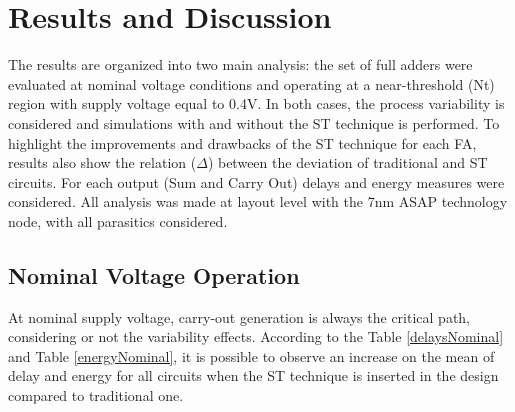 \documentclass[ecp,tc, english]{iiufrgs}
\begin{document}
\chapter{Results and Discussion}

The results are organized into two main analysis: the set of full adders were evaluated at nominal voltage conditions and operating at a near-threshold (Nt) region with supply voltage equal to 0.4V. In both cases, the process variability is considered and simulations with and without the ST technique is performed. To highlight the improvements and drawbacks of the ST technique for each FA, results also show the relation (\(\Delta\)) between the deviation of traditional and ST circuits. For each output (Sum and Carry Out) delays and energy measures were considered. All analysis was made at layout level with the 7nm ASAP technology node, with all parasitics considered. 






\section{Nominal Voltage Operation}

At nominal supply voltage, carry-out generation is always the critical path, considering or not the variability effects. According to the Table \ref{delaysNominal} and Table \ref{energyNominal}, it is possible to observe an increase on the mean of delay and energy for all circuits when the ST technique is inserted in the design compared to traditional one.
\end{document}
